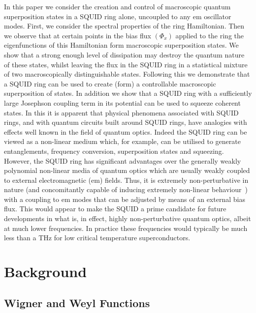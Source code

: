 \documentclass[twocolumn,a4paper,superscriptaddress,showpacs,floatfix,pra]{revtex4}
\begin{document}
In  this paper  we consider  the creation  and control  of macroscopic
quantum superposition states  in a SQUID ring alone,  uncoupled to any
em oscillator modes. First, we consider the spectral properties of the
ring Hamiltonian.  Then we observe  that at certain points in the bias
flux $\left( \Phi _{x}\right) $ applied to the ring the eigenfunctions
of  this Hamiltonian  form macroscopic  superposition states.  We show
that  a strong  enough level  of dissipation  may destroy  the quantum
nature of these states, whilst leaving the flux in the SQUID ring in a
statistical    mixture   of   two    macroscopically   distinguishable
states. Following this we demonstrate that a SQUID ring can be used to
create (form) a controllable  macroscopic superposition of states.  In
addition we show that a SQUID ring with a sufficiently large Josephson
coupling  term  in its  potential  can  be  used to  squeeze  coherent
states. In this it is apparent that physical phenomena associated with
SQUID rings, and with quantum  circuits built around SQUID rings, have
analogies   with  effects  well   known  in   the  field   of  quantum
optics. Indeed  the SQUID  ring can be  viewed as a  non-linear medium
which,  for  example,  can  be  utilised  to  generate  entanglements,
frequency conversion, superposition states and squeezing. However, the
SQUID  ring  has  significant  advantages over  the  generally  weakly
polynomial non-linear media of quantum optics which are usually weakly
coupled to external electromagnetic (em) fields. Thus, it is extremely
non-perturbative  in  nature (and  concomitantly  capable of  inducing
extremely                                                    non-linear
behaviour~\cite{EverittSCVRPP01,EverittCSPPVR01,Spi1992})    with    a
coupling to em modes that can be adjusted by means of an external bias
flux. This would appear to make the SQUID a prime candidate for future
developments in  what is,  in effect, highly  non-perturbative quantum
optics,  albeit   at  much   lower  frequencies.  In   practice  these
frequencies would typically  be much less than a  THz for low critical
temperature superconductors.

\section*{Background}

\subsection*{Wigner and Weyl Functions}
\end{document}
